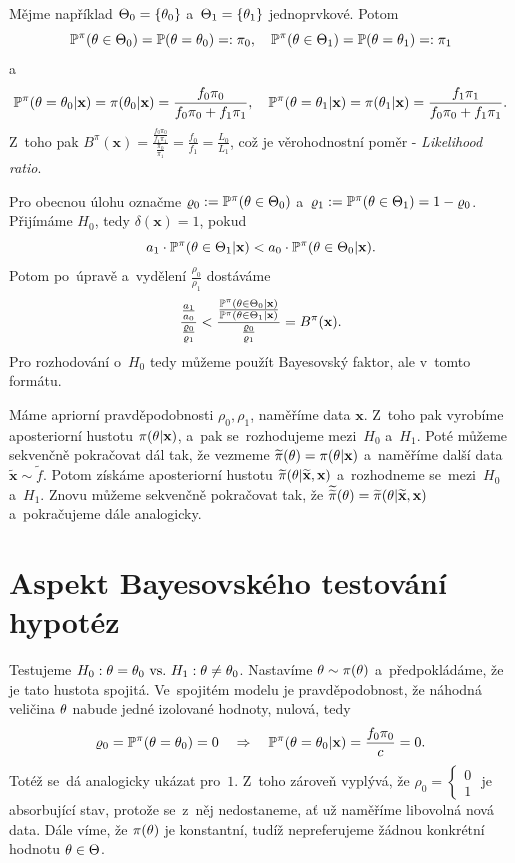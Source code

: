 \begin{remark}
	Mějme například $\Theta_0=\{\theta_0\}$ a~$\Theta_1=\{\theta_1\}$ jednoprvkové. Potom $$
	\mathbb{P}^\pi(\theta\in\Theta_0)=\mathbb{P}(\theta=\theta_0)=:\pi_0,\quad \mathbb{P}^\pi(\theta\in\Theta_1)=\mathbb{P}(\theta=\theta_1)=:\pi_1$$
	a $$ \mathbb{P}^\pi(\theta=\theta_0|\textbf{x})=\pi(\theta_0|\textbf{x})=\frac{f_0\pi_0}{f_0\pi_0+f_1\pi_1}, \quad \mathbb{P}^\pi(\theta=\theta_1|\textbf{x})=\pi(\theta_1|\textbf{x})=\frac{f_1\pi_1}{f_0\pi_0+f_1\pi_1}.
$$ Z~toho pak 
	$ B^\pi(\textbf{x})=\frac{\frac{f_0\pi_0}{f_1\pi_1}}{\frac{\pi_0}{\pi_1}}=\frac{f_0}{f_1}=\frac{L_0}{L_1}$, což je věrohodnostní poměr - \textit{Likelihood ratio}.
\end{remark}

Pro obecnou úlohu označme $\varrho_0:=\mathbb{P}^\pi(\theta\in\Theta_0)$ a~$\varrho_1:=\mathbb{P}^\pi(\theta\in\Theta_1)=1-\varrho_0$. Přijímáme $H_0$, tedy $\delta(\textbf{x})=1$, pokud $$a_1\cdot \mathbb{P}^\pi(\theta\in\Theta_1|\textbf{x})<a_0\cdot\mathbb{P}^\pi(\theta\in\Theta_0|\textbf{x}).$$ 
Potom po~úpravě a~vydělení $\frac{\rho_0}{\rho_1}$ dostáváme
$$\frac{\frac{a_1}{a_0}}{\frac{\varrho_0}{\varrho_1}}<\frac{\frac{\mathbb{P}^\pi(\theta\in\Theta_0|\textbf{x})}{\mathbb{P}^\pi(\theta\in\Theta_1|\textbf{x})}}{\frac{\varrho_0}{\varrho_1}}=B^\pi(\textbf{x}).$$
Pro rozhodování o~$H_0$ tedy můžeme použít Bayesovský faktor, ale v~tomto formátu.
\begin{remark}
	Máme apriorní pravděpodobnosti $\rho_0,\rho_1$, naměříme data $\textbf{x}$. Z~toho pak vyrobíme aposteriorní hustotu $\pi(\theta|\textbf{x})$, a~pak se~rozhodujeme mezi~$H_0$ a~$H_1$. Poté můžeme sekvenčně pokračovat dál tak, že vezmeme $\widetilde{\pi}(\theta)=\pi(\theta|\textbf{x})$ a~naměříme další data $\widetilde{\textbf{x}}\sim \widetilde{f}$. Potom získáme aposteriorní hustotu $\widetilde{\pi}(\theta|\widetilde{\textbf{x}},\textbf{x})$ a~rozhodneme se~mezi~$H_0$ a~$H_1$. Znovu můžeme sekvenčně pokračovat tak, že $\widetilde{\widetilde{\pi}}(\theta)=\widetilde{\pi}(\theta|\widetilde{\textbf{x}},\textbf{x})$ a~pokračujeme dále analogicky.
\end{remark}

\section{Aspekt Bayesovského testování hypotéz}

Testujeme $H_0: \theta=\theta_0 ~\text{vs.}~ H_1: \theta\neq\theta_0$. Nastavíme $\theta\sim\pi(\theta)$ a~předpokládáme, že je tato hustota spojitá. Ve~spojitém modelu je pravděpodobnost, že náhodná veličina $\theta$ nabude jedné izolované hodnoty, nulová, tedy
$$ \varrho_0=\mathbb{P}^\pi(\theta=\theta_0)=0\quad\Rightarrow\quad \mathbb{P}^\pi(\theta=\theta_0|\textbf{x})=\frac{f_0\pi_0}{c}=0.$$
Totéž se~dá analogicky ukázat pro~$1$. Z~toho zároveň vyplývá, že $\rho_0=\begin{cases}
0\\1
\end{cases}$ je absorbující stav, protože se~z~něj nedostaneme, ať už naměříme libovolná nová data. Dále víme, že $\pi(\theta)$ je konstantní, tudíž nepreferujeme žádnou konkrétní hodnotu $\theta\in\Theta$. 

